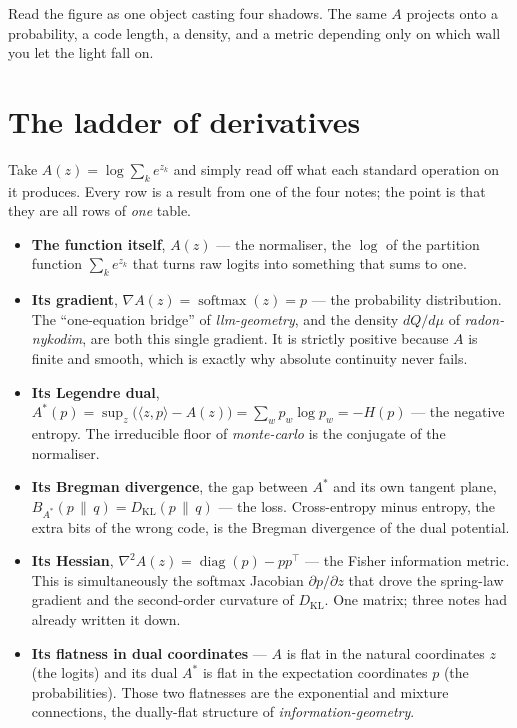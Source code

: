 \documentclass[11pt]{article}
\begin{document}
Read the figure as one object casting four shadows. The same $A$ projects onto a probability,
a code length, a density, and a metric depending only on which wall you let the light fall on.

\section{The ladder of derivatives}

Take $A(z) = \log\sum_k e^{z_k}$ and simply read off what each standard operation on it
produces. Every row is a result from one of the four notes; the point is that they are all
rows of \emph{one} table.

\begin{itemize}[leftmargin=1.5em, itemsep=4pt]
  \item \textbf{The function itself}, $A(z)$ --- the normaliser, the $\log$ of the partition
  function $\sum_k e^{z_k}$ that turns raw logits into something that sums to one.
  \item \textbf{Its gradient}, $\nabla A(z) = \operatorname{softmax}(z) = p$ --- the
  probability distribution. The ``one-equation bridge'' of \emph{llm-geometry}, and the density
  $dQ/d\mu$ of \emph{radon-nykodim}, are both this single gradient. It is strictly positive
  because $A$ is finite and smooth, which is exactly why absolute continuity never fails.
  \item \textbf{Its Legendre dual}, $A^{*}(p) = \sup_z\bigl(\langle z,p\rangle - A(z)\bigr) =
  \sum_w p_w \log p_w = -H(p)$ --- the negative entropy. The irreducible floor of
  \emph{monte-carlo} is the conjugate of the normaliser.
  \item \textbf{Its Bregman divergence}, the gap between $A^{*}$ and its own tangent plane,
  $B_{A^{*}}(p \,\|\, q) = D_{\mathrm{KL}}(p \,\|\, q)$ --- the loss. Cross-entropy minus
  entropy, the extra bits of the wrong code, is the Bregman divergence of the dual potential.
  \item \textbf{Its Hessian}, $\nabla^2 A(z) = \operatorname{diag}(p) - p p^{\top}$ --- the
  Fisher information metric. This is simultaneously the softmax Jacobian $\partial p/\partial
  z$ that drove the spring-law gradient and the second-order curvature of $D_{\mathrm{KL}}$.
  One matrix; three notes had already written it down.
  \item \textbf{Its flatness in dual coordinates} --- $A$ is flat in the natural coordinates
  $z$ (the logits) and its dual $A^{*}$ is flat in the expectation coordinates $p$ (the
  probabilities). Those two flatnesses are the exponential and mixture connections, the
  dually-flat structure of \emph{information-geometry}.
\end{itemize}
\end{document}
